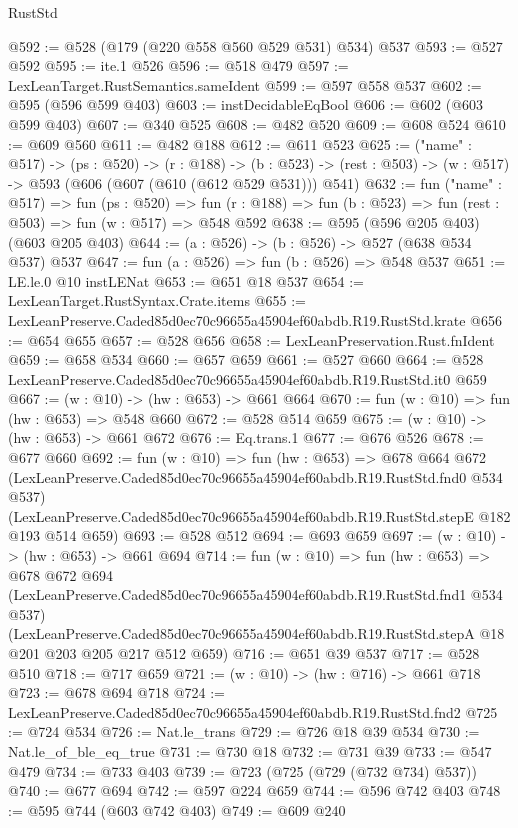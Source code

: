 \begin{lexlean}{RustStd}
\begin{coremodule}
@592 := @528 (@179 (@220 @558 @560 @529 @531) @534) @537
@593 := @527 @592
@595 := ite.{1} @526
@596 := @518 @479
@597 := LexLeanTarget.RustSemantics.sameIdent
@599 := @597 @558 @537
@602 := @595 (@596 @599 @403)
@603 := instDecidableEqBool
@606 := @602 (@603 @599 @403)
@607 := @340 @525
@608 := @482 @520
@609 := @608 @524
@610 := @609 @560
@611 := @482 @188
@612 := @611 @523
@625 := ("name" : @517) ->
  (ps : @520) ->
  (r : @188) ->
  (b : @523) -> (rest : @503) -> (w : @517) -> @593 (@606 (@607 (@610 (@612 @529 @531))) @541)
@632 := fun ("name" : @517) =>
  fun (ps : @520) =>
  fun (r : @188) => fun (b : @523) => fun (rest : @503) => fun (w : @517) => @548 @592
@638 := @595 (@596 @205 @403) (@603 @205 @403)
@644 := (a : @526) -> (b : @526) -> @527 (@638 @534 @537) @537
@647 := fun (a : @526) => fun (b : @526) => @548 @537
@651 := LE.le.{0} @10 instLENat
@653 := @651 @18 @537
@654 := LexLeanTarget.RustSyntax.Crate.items
@655 := LexLeanPreserve.Caded85d0ec70c96655a45904ef60abdb.R19.RustStd.krate
@656 := @654 @655
@657 := @528 @656
@658 := LexLeanPreservation.Rust.fnIdent
@659 := @658 @534
@660 := @657 @659
@661 := @527 @660
@664 := @528 LexLeanPreserve.Caded85d0ec70c96655a45904ef60abdb.R19.RustStd.it0 @659
@667 := (w : @10) -> (hw : @653) -> @661 @664
@670 := fun (w : @10) => fun (hw : @653) => @548 @660
@672 := @528 @514 @659
@675 := (w : @10) -> (hw : @653) -> @661 @672
@676 := Eq.trans.{1}
@677 := @676 @526
@678 := @677 @660
@692 := fun (w : @10) =>
  fun (hw : @653) =>
  @678
    @664
    @672
    (LexLeanPreserve.Caded85d0ec70c96655a45904ef60abdb.R19.RustStd.fnd0 @534 @537)
    (LexLeanPreserve.Caded85d0ec70c96655a45904ef60abdb.R19.RustStd.stepE @182 @193 @514 @659)
@693 := @528 @512
@694 := @693 @659
@697 := (w : @10) -> (hw : @653) -> @661 @694
@714 := fun (w : @10) =>
  fun (hw : @653) =>
  @678
    @672
    @694
    (LexLeanPreserve.Caded85d0ec70c96655a45904ef60abdb.R19.RustStd.fnd1 @534 @537)
    (LexLeanPreserve.Caded85d0ec70c96655a45904ef60abdb.R19.RustStd.stepA
      @18
      @201
      @203
      @205
      @217
      @512
      @659)
@716 := @651 @39 @537
@717 := @528 @510
@718 := @717 @659
@721 := (w : @10) -> (hw : @716) -> @661 @718
@723 := @678 @694 @718
@724 := LexLeanPreserve.Caded85d0ec70c96655a45904ef60abdb.R19.RustStd.fnd2
@725 := @724 @534
@726 := Nat.le_trans
@729 := @726 @18 @39 @534
@730 := Nat.le_of_ble_eq_true
@731 := @730 @18
@732 := @731 @39
@733 := @547 @479
@734 := @733 @403
@739 := @723 (@725 (@729 (@732 @734) @537))
@740 := @677 @694
@742 := @597 @224 @659
@744 := @596 @742 @403
@748 := @595 @744 (@603 @742 @403)
@749 := @609 @240

\end{coremodule}
\end{lexlean}
